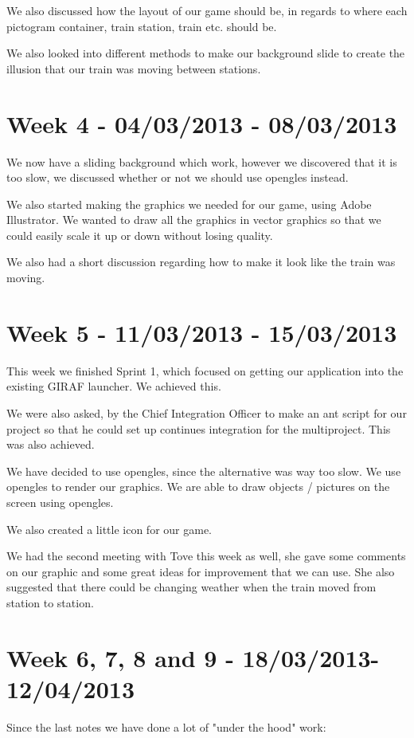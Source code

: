 We also discussed how the layout of our game should be, in regards to where each pictogram container, train station, train etc. should be. 

We also looked into different methods to make our background slide to create the illusion that our train was moving between stations. 

\section*{Week 4 - 04/03/2013 - 08/03/2013}
We now have a sliding background which work, however we discovered that it is too slow, we discussed whether or not we should use \ac{opengles} instead. 

We also started making the graphics we needed for our game, using Adobe Illustrator. We wanted to draw all the graphics in vector graphics so that we could easily scale it up or down without losing quality. 

We also had a short discussion regarding how to make it look like the train was moving.

\section*{Week 5 - 11/03/2013 - 15/03/2013}
This week we finished Sprint 1, which focused on getting our application into the existing GIRAF launcher. We achieved this. 

We were also asked, by the Chief Integration Officer to make an ant script for our project so that he could set up continues integration for the multiproject. This was also achieved. 

We have decided to use \ac{opengles}, since the alternative was way too slow. We use \ac{opengles} to render our graphics. We are able to draw objects / pictures on the screen using \ac{opengles}. 

We also created a little icon for our game. 

We had the second meeting with Tove this week as well, she gave some comments on our graphic and some great ideas for improvement that we can use. She also suggested that there could be changing weather when the train moved from station to station. 

\section*{Week 6, 7, 8 and 9 - 18/03/2013-12/04/2013}
Since the last notes we have done a lot of "under the hood" work:

